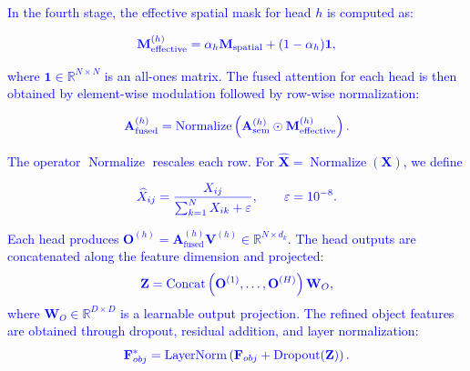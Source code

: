 \documentclass[lettersize,journal]{IEEEtran}
\begin{document}
\textcolor{blue}{In the fourth stage, the effective spatial mask for head $h$ is computed as:}

\begin{equation}
\textcolor{blue}{\mathbf{M}_{\mathrm{effective}}^{(h)} = \alpha_h \mathbf{M}_{\mathrm{spatial}} + (1-\alpha_h)\mathbf{1},}
\end{equation}

\textcolor{blue}{where $\mathbf{1}\in\mathbb{R}^{N\times N}$ is an all-ones matrix. The fused attention for each head is then obtained by element-wise modulation followed by row-wise normalization:}

\begin{equation}
\textcolor{blue}{\mathbf{A}_{\mathrm{fused}}^{(h)} = \operatorname{Normalize} \left(\mathbf{A}_{\mathrm{sem}}^{(h)} \odot \mathbf{M}_{\mathrm{effective}}^{(h)} \right).}
\end{equation}

\textcolor{blue}{The operator $\operatorname{Normalize}$ rescales each row. For $\widehat{\mathbf{X}} =\operatorname{Normalize}(\mathbf{X})$, we define}

\begin{equation}
\textcolor{blue}{\widehat{X}_{ij} = \frac{X_{ij}} {\sum_{k=1}^{N}X_{ik}+\varepsilon}, \qquad \varepsilon=10^{-8}.}
\end{equation}

\textcolor{blue}{Each head produces $\mathbf{O}^{(h)} =\mathbf{A}_{\mathrm{fused}}^{(h)}\mathbf{V}^{(h)} \in\mathbb{R}^{N\times d_k}$. The head outputs are concatenated along the feature dimension and projected:}
\begin{equation}
\textcolor{blue}{ \mathbf{Z} = \operatorname{Concat} \left(\mathbf{O}^{(1)},\ldots,\mathbf{O}^{(H)} \right)\mathbf{W}_O,}
\end{equation}
\textcolor{blue}{where $\mathbf{W}_O\in\mathbb{R}^{D\times D}$ is a learnable output projection. The refined object features are obtained through dropout, residual addition, and layer normalization:}
\begin{equation}
\textcolor{blue}{\mathbf{F}_{obj}^{*} = \operatorname{LayerNorm} \left(\mathbf{F}_{obj} + \operatorname{Dropout}(\mathbf{Z})\right).}
\end{equation}
\end{document}
